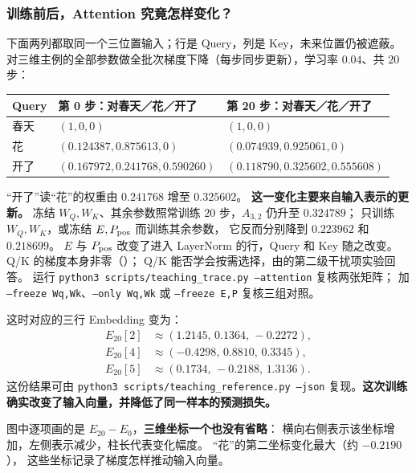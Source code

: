 \subsubsection*{训练前后，Attention 究竟怎样变化？}
下面两列都取同一个三位置输入；行是 Query，列是 Key，未来位置仍被遮蔽。
对三维主例的全部参数做全批次梯度下降（每步同步更新），学习率 $0.04$、共 $20$ 步：
\begin{center}\small
{}
\begin{tabularx}{\linewidth}{@{}p{23mm}XX@{}}\toprule
Query & 第 0 步：对春天／花／开了 & 第 20 步：对春天／花／开了\\\midrule
春天 & $(1,0,0)$ & $(1,0,0)$\\
花 & $(0.124387,0.875613,0)$ & $(0.074939,0.925061,0)$\\
开了 & $(0.167972,0.241768,0.590260)$ & $(0.118790,0.325602,0.555608)$\\\bottomrule
\end{tabularx}
\end{center}
“开了”读“花”的权重由 $0.241768$ 增至 $0.325602$。
\textbf{这一变化主要来自输入表示的更新。}
冻结 $W_Q,W_K$、其余参数照常训练 $20$ 步，$A_{3,2}$ 仍升至 $0.324789$；
只训练 $W_Q,W_K$，或冻结 $E,P_{\rm pos}$ 而训练其余参数，
它反而分别降到 $0.223962$ 和 $0.218699$。
$E$ 与 $P_{\rm pos}$ 改变了进入 LayerNorm 的行，Query 和 Key 随之改变。
Q/K 的梯度本身非零（）；
Q/K 能否学会按需选择，由的第二级干扰项实验回答。
运行 \texttt{python3 scripts/teaching\_trace.py --attention} 复核两张矩阵；
加 \texttt{--freeze Wq,Wk}、\texttt{--only Wq,Wk} 或 \texttt{--freeze E,P} 复核三组对照。

\label{sec:embedding-training-snapshot}
这时对应的三行 Embedding 变为：
\[
\begin{aligned}
E_{20}[2]&\approx(1.2145,\,0.1364,\,-0.2272),\\
E_{20}[4]&\approx(-0.4298,\,0.8810,\,0.3345),\\
E_{20}[5]&\approx(0.1734,\,-0.2188,\,1.3136).
\end{aligned}
\]
这份结果可由 \texttt{python3 scripts/teaching\_reference.py --json}
复现。\textbf{这次训练确实改变了输入向量，并降低了同一样本的预测损失。}

\par\medskip
\Needspace{74mm} %


图中逐项画的是 $E_{20}-E_0$，\textbf{三维坐标一个也没有省略}：
横向右侧表示该坐标增加，左侧表示减少，柱长代表变化幅度。
“花”的第二坐标变化最大（约 $-0.2190$），
这些坐标记录了梯度怎样推动输入向量。


